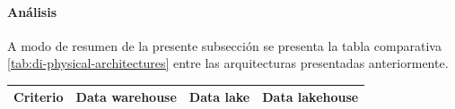 \paragraph{Análisis\newline}
A modo de resumen de la presente subsección se presenta la tabla comparativa \ref{tab:di-physical-architectures} entre las
arquitecturas presentadas anteriormente.

\begin{longtable}{|p{3cm}|p{4cm}|p{4cm}|p{4cm}|}
    \hline
    \textbf{Criterio}         & \textbf{Data warehouse}                                   & \textbf{Data lake}                                                       & \textbf{Data lakehouse}                                                  \\ \hline
    

\end{longtable}
